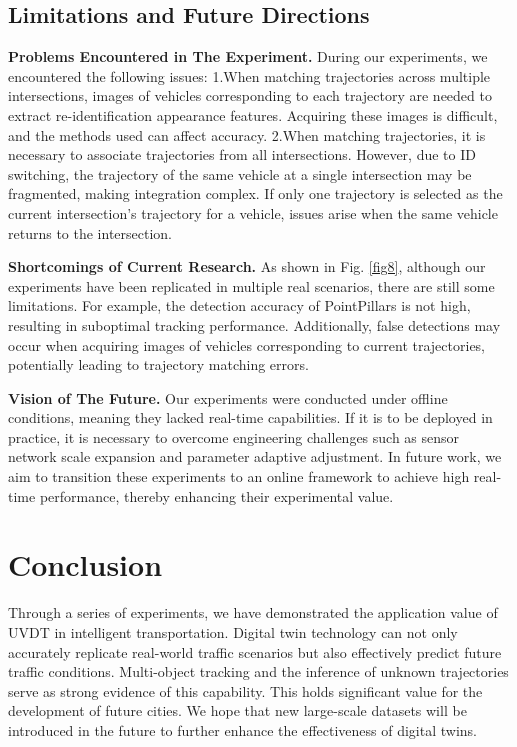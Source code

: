 \documentclass[journal,twoside,web]{ieeecolor}
\begin{document}
\subsection{Limitations and Future Directions}

\textbf{Problems Encountered in The Experiment.}
During our experiments, we encountered the following issues:  
1.When matching trajectories across multiple intersections, images of vehicles corresponding to each trajectory are needed to extract re-identification appearance features. 
Acquiring these images is difficult, and the methods used can affect accuracy.  
2.When matching trajectories, it is necessary to associate trajectories from all intersections. 
However, due to ID switching, the trajectory of the same vehicle at a single intersection may be fragmented, making integration complex. 
If only one trajectory is selected as the current intersection's trajectory for a vehicle, issues arise when the same vehicle returns to the intersection.

\textbf{Shortcomings of Current Research.}
As shown in Fig. \ref{fig8}, although our experiments have been replicated in multiple real scenarios, there are still some limitations.
For example, the detection accuracy of PointPillars is not high, resulting in suboptimal tracking performance. 
Additionally, false detections may occur when acquiring images of vehicles corresponding to current trajectories, potentially leading to trajectory matching errors.

\textbf{Vision of The Future.}
Our experiments were conducted under offline conditions, meaning they lacked real-time capabilities. 
If it is to be deployed in practice, it is necessary to overcome engineering challenges such as sensor network scale expansion and parameter adaptive adjustment.
In future work, we aim to transition these experiments to an online framework to achieve high real-time performance, thereby enhancing their experimental value.


\section{Conclusion}

Through a series of experiments, we have demonstrated the application value of UVDT in intelligent transportation. 
Digital twin technology can not only accurately replicate real-world traffic scenarios but also effectively predict future traffic conditions. 
Multi-object tracking and the inference of unknown trajectories serve as strong evidence of this capability. 
This holds significant value for the development of future cities.
We hope that new large-scale datasets will be introduced in the future to further enhance the effectiveness of digital twins.
\end{document}
